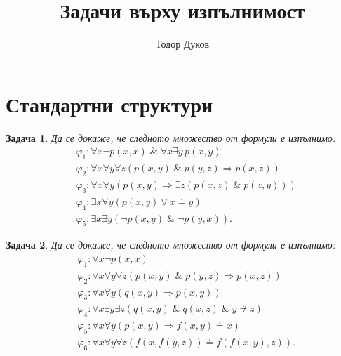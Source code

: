 \documentclass[12pt]{article}
\title{Задачи върху изпълнимост}
\author{Тодор Дуков}
\date{}
\newtheorem{problem}{Задача}[section]
\theoremstyle{definition}
\theoremstyle{remark}
\begin{document}
\maketitle

\section{Стандартни структури}

\begin{problem}
Да се докаже, че следното множество от формули е изпълнимо:
\begin{align*}
       & \varphi_1 : \forall x \neg p(x, x) \; \& \; \forall x \exists y \, p(x, y)                 \\
       & \varphi_2 : \forall x \forall y \forall z (p(x, y) \; \& \; p(y, z) \Rightarrow p(x, z))   \\
       & \varphi_3 : \forall x \forall y (p(x, y) \Rightarrow \exists z (p(x, z) \; \& \; p(z, y))) \\
       & \varphi_4 : \exists x \forall y (p(x, y) \lor x \doteq y)                                  \\
       & \varphi_5 : \exists x \exists y (\neg p(x, y) \; \& \; \neg p(y, x)).
\end{align*}
\end{problem}

\begin{problem}
Да се докаже, че следното множество от формули е изпълнимо:
\begin{align*}
       & \varphi_1 : \forall x \neg p(x, x)                                                            \\
       & \varphi_2 : \forall x \forall y \forall z (p(x, y) \; \& \; p(y, z) \Rightarrow p(x, z))      \\
       & \varphi_3 : \forall x \forall y (q(x, y) \Rightarrow p(x, y))                                 \\
       & \varphi_4 : \forall x \exists y \exists z (q(x, y) \; \& \; q(x, z) \; \& \; y \not \doteq z) \\
       & \varphi_5 : \forall x \forall y (p(x, y) \Rightarrow f(x, y) \doteq x)                        \\
       & \varphi_6 : \forall x \forall y \forall z (f(x, f(y, z)) \doteq f(f(x, y), z)).
\end{align*}
\end{problem}
\end{document}
